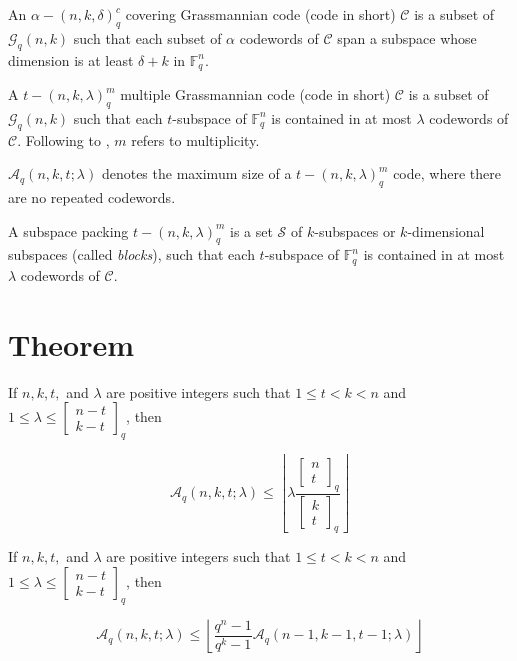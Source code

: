 %
\begin{defn}
 An $\alpha-\left(n,k,\delta\right)_{q}^{c}$ covering Grassmannian
code (code in short) $\mathcal{C}$ is a subset of $\mathcal{G}_{q}\left(n,k\right)$
such that each subset of $\alpha$ codewords of $\mathcal{C}$ span
a subspace whose dimension is at least $\delta+k$ in $\ensuremath{\mathbb{F}}_{q}^{n}$.
\end{defn}
%
\begin{defn}
 A $t-\left(n,k,\lambda\right)_{q}^{m}$ multiple Grassmannian code
(code in short) $\mathcal{C}$ is a subset of $\mathcal{G}_{q}\left(n,k\right)$
such that each $t$-subspace of $\ensuremath{\mathbb{F}}_{q}^{n}$
is contained in at most $\lambda$ codewords of $\mathcal{C}$. Following
to \cite{Zhang:2019}, $m$ refers to multiplicity.
\end{defn}
%
\begin{defn}
$\mathcal{A}_{q}\left(n,k,t;\lambda\right)$ denotes the maximum size
of a $t-\left(n,k,\lambda\right)_{q}^{m}$ code, where there are no
repeated codewords.
\end{defn}
%
\begin{defn}
 A subspace packing $t-\left(n,k,\lambda\right)_{q}^{m}$ is a set
$\mathcal{S}$ of $k$-subspaces or $k$-dimensional subspaces (called
\textit{blocks}), such that each $t$-subspace of $\ensuremath{\mathbb{F}}_{q}^{n}$
is contained in at most $\lambda$ codewords of $\mathcal{C}$.
\end{defn}

\section{Theorem}
\begin{thm}
If $n,k,t,$ and $\lambda$ are positive integers such that $1\leq t<k<n$
and $1\leq\lambda\leq\left[\begin{array}{c}
n-t\\
k-t
\end{array}\right]_{q}$, then

\[
\mathcal{A}_{q}\left(n,k,t;\lambda\right)\leq\left\lfloor \lambda\frac{\left[\begin{array}{c}
n\\
t
\end{array}\right]_{q}}{\left[\begin{array}{c}
k\\
t
\end{array}\right]_{q}}\right\rfloor 
\]
\end{thm}
%
\begin{thm}
If $n,k,t,$ and $\lambda$ are positive integers such that $1\leq t<k<n$
and $1\leq\lambda\leq\left[\begin{array}{c}
n-t\\
k-t
\end{array}\right]_{q}$, then

\[
\mathcal{A}_{q}\left(n,k,t;\lambda\right)\leq\left\lfloor \frac{q^{n}-1}{q^{k}-1}\mathcal{A}_{q}\left(n-1,k-1,t-1;\lambda\right)\right\rfloor 
\]
\end{thm}

\clearpage